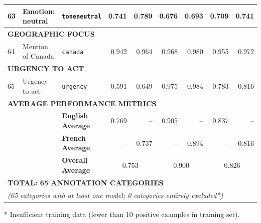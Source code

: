 \documentclass[12pt]{article}
\renewcommand\_{\texttt{\detokenize{_}\allowbreak}}
\begin{document}
{\begin{longtable}{p{0.4cm}p{4.0cm}p{3.0cm}rrrrrr}
63 & Emotion: neutral & \texttt{tone\_neutral} & 0.741 & 0.789 & 0.676 & 0.693 & 0.709 & 0.741 \\
\midrule
\multicolumn{9}{l}{\cellcolor{gray!10}\textbf{GEOGRAPHIC FOCUS}} \\
\midrule
64 & Mention of Canada & \texttt{canada} & 0.942 & 0.964 & 0.968 & 0.980 & 0.955 & 0.972 \\
\midrule
\multicolumn{9}{l}{\cellcolor{gray!10}\textbf{URGENCY TO ACT}} \\
\midrule
65 & Urgency to act & \texttt{urgency} & 0.591 & 0.649 & 0.975 & 0.984 & 0.783 & 0.816 \\
\multicolumn{9}{l}{\cellcolor{gray!20}\textbf{AVERAGE PERFORMANCE METRICS}} \\
& & \textbf{English Average} & 0.769 & -- & 0.905 & -- & 0.837 & -- \\
& & \textbf{French Average} & -- & 0.737 & -- & 0.894 & -- & 0.816 \\
& & \textbf{Overall Average} & \multicolumn{2}{c}{0.753} & \multicolumn{2}{c}{0.900} & \multicolumn{2}{c}{0.826} \\
\midrule
\multicolumn{9}{l}{\cellcolor{gray!20}\textbf{TOTAL: 65 ANNOTATION CATEGORIES}} \\
\multicolumn{9}{l}{\cellcolor{gray!20}\textit{(65 categories with at least one model; 0 categories entirely excluded*)}} \\
\end{longtable}
\vspace{0.5em}
\noindent\footnotesize
* Insufficient training data (fewer than 10 positive examples in training set).
}
\endlandscape
\end{document}
